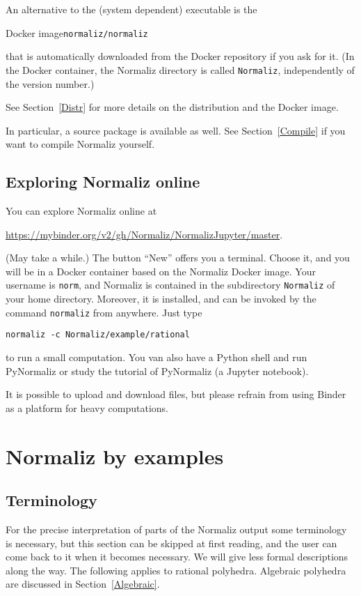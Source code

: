 \documentclass[12pt,a4paper]{scrartcl}
\theoremstyle{definition}
\begin{document}
An alternative to the (system dependent) executable is the
\begin{center}
	Docker image\qquad \verb|normaliz/normaliz|
\end{center}
that is automatically downloaded from the Docker repository if you ask for it. (In the Docker container, the Normaliz directory is called \verb|Normaliz|, independently of the version number.)

See Section~\ref{Distr} for more details on the distribution and the Docker image.

In particular, a source package is available as well. See Section~\ref{Compile} if you want to compile Normaliz yourself.

\subsection{Exploring Normaliz online}

You can explore Normaliz online at
\begin{center}
	\url{https://mybinder.org/v2/gh/Normaliz/NormalizJupyter/master}.
\end{center}
(May take a while.) The button ``New'' offers you a terminal. Choose it, and you will be in a Docker container based on the Normaliz Docker image. Your username is \verb|norm|, and Normaliz is contained in the subdirectory \verb|Normaliz| of your home directory. Moreover, it is installed, and can be invoked by the command \verb|normaliz| from anywhere. Just type
\begin{Verbatim}
normaliz -c Normaliz/example/rational
\end{Verbatim}
to run a small computation. You van also have a Python shell and run PyNormaliz or study the tutorial of PyNormaliz (a Jupyter notebook).

It is possible to upload and download files, but please refrain from using Binder as a platform for heavy computations.



\section{Normaliz by examples}\label{Examples}

\subsection{Terminology}\label{Term}

For the precise interpretation of parts of the Normaliz output some terminology is necessary, but this section can be skipped at first reading, and the user can come back to it when it becomes necessary. We will give less formal descriptions along the way. The following applies to rational polyhedra. Algebraic polyhedra are discussed in Section~\ref{Algebraic}.
\end{document}
